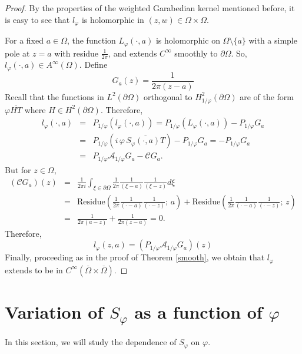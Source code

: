 \documentclass[11pt, reqno]{amsart}
\numberwithin{equation}{section}
\begin{document}
\begin{proof}
By the properties of the weighted Garabedian kernel mentioned before, it is easy to see that $l_{\varphi}$ is holomorphic in $(z,w)\in\Omega\times\Omega$. 

\medskip

For a fixed $a\in\Omega$, the function $L_{\varphi}(\cdot,a)$ is holomorphic on $\Omega\setminus\{a\}$ with a simple pole at $z=a$ with residue $\frac{1}{2\pi}$, and extends $C^{\infty}$ smoothly to $\partial\Omega$. 
So, $l_{\varphi}(\cdot,a)\in A^{\infty}(\Omega)$. Define
\[
G_a(z) = \frac{1}{2\pi(z-a)}
\]
Recall that the functions in $L^2(\partial\Omega)$ orthogonal to $H^2_{1/\varphi}(\partial\Omega)$ are of the form $\varphi \overline{HT}$ where $H\in H^2(\partial\Omega)$. Therefore,
\begin{eqnarray*}
l_{\varphi}(\cdot,a) 
&=&
P_{1/\varphi}(l_{\varphi}(\cdot,a))
=
P_{1/\varphi}(L_{\varphi}(\cdot,a)) - P_{1/\varphi}G_a
\\
&=&
P_{1/\varphi}(i\,\varphi\, \overline{S_{\varphi}(\cdot,a)T}) - P_{1/\varphi}G_a
=
-P_{1/\varphi}G_a 
\\
&=&
P_{1/\varphi}\mathcal{A}_{1/\varphi} G_a - \mathcal{C} G_a.
\end{eqnarray*}
But for $z\in\Omega$,
\begin{eqnarray*}
(\mathcal{C}G_a)(z)
&=&
\frac{1}{2\pi i}\int_{\xi\in\partial\Omega} \frac{1}{2\pi}\frac{1}{(\xi - a)} \frac{1}{(\xi -z)} d\xi
\\
&=& \text{Residue} \left( \frac{1}{2\pi}\frac{1}{(\cdot - a)} \frac{1}{(\cdot -z)} ; \,a\right) + \text{Residue} \left( \frac{1}{2\pi}\frac{1}{(\cdot - a)} \frac{1}{(\cdot -z)} ;\, z\right)
\\
&=&
\frac{1}{2\pi(a-z)} + \frac{1}{2\pi(z-a)} = 0.
\end{eqnarray*}
Therefore,
\[
l_{\varphi}(z,a) = (P_{1/\varphi}\mathcal{A}_{1/\varphi} G_a) (z)
\]
Finally, proceeding as in the proof of Theorem \ref{smooth}, we obtain that $l_{\varphi}$ extends to be in $ C^{\infty}(\overline{\Omega}\times\overline{\Omega})$. 
\end{proof}

\section{Variation of $S_{\varphi}$ as a function of $\varphi$}

\noindent In this section, we will study the dependence of $S_{\varphi}$ on $\varphi$.
\end{document}
